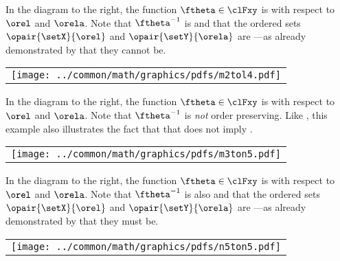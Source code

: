 \begin{minipage}{\tw-40mm}%
\begin{example}
\footnotemark
\label{ex:order_M2_L4}
In the diagram to the right, the function $\ftheta\in\clFxy$ 
is  with respect to $\orel$ and $\orela$.
Note that $\ftheta^{-1}$ is  and that
the ordered sets $\opair{\setX}{\orel}$ and $\opair{\setY}{\orela}$ are ---as already demonstrated 
by  that they cannot be.
\end{example}
\end{minipage}%
%
\hfill%
\begin{tabular}{c}
  \texttt{[image: ../common/math/graphics/pdfs/m2tol4.pdf]}%
\end{tabular}

\begin{minipage}{\tw-40mm}%
\begin{example}
\label{ex:order_M3_N5}
In the diagram to the right, the function $\ftheta\in\clFxy$ 
is  with respect to $\orel$ and $\orela$.
Note that $\ftheta^{-1}$ is \emph{not} order preserving.
Like ,
this example also illustrates the fact that 
that  does not imply .
\end{example}
\end{minipage}%
\hfill%
\begin{tabular}{c}
  \texttt{[image: ../common/math/graphics/pdfs/m3ton5.pdf]}%
\end{tabular}

\begin{minipage}{\tw-40mm}%
\begin{example}
\label{ex:order_N5_N5}
In the diagram to the right, the function $\ftheta\in\clFxy$ 
is  with respect to $\orel$ and $\orela$.
Note that $\ftheta^{-1}$ is also  and that
the ordered sets $\opair{\setX}{\orel}$ and $\opair{\setY}{\orela}$
are ---as already demonstrated 
by  that they must be.
\end{example}
\end{minipage}%
\hfill%
\begin{tabular}{c}
  \texttt{[image: ../common/math/graphics/pdfs/n5ton5.pdf]}%
\end{tabular}

